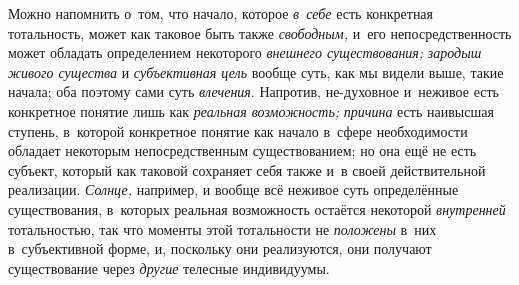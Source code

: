 Можно напомнить о~том, что начало, которое {\em в~себе} есть
конкретная тотальность, может как таковое быть также {\em свободным,} и~его
непосредственность может обладать определением некоторого
{\em внешнего существования;}
{\em зародыш живого существа} и {\em субъективная цель}
вообще суть, как мы видели выше, такие начала; оба поэтому
сами суть {\em влечения}.
Напротив, не-духовное и~неживое есть конкретное понятие лишь
как {\em реальная возможность;} {\em причина} есть
наивысшая ступень, в~которой конкретное понятие как начало в~сфере
необходимости обладает некоторым непосредственным существованием; но она
ещё не есть субъект, который как таковой сохраняет себя также и~в своей
действительной реализации. {\em Солнце,} например, и
вообще всё неживое суть определённые существования, в~которых реальная
возможность остаётся некоторой {\em внутренней}
тотальностью, так что моменты этой тотальности не
{\em положены}
в~них в~субъективной форме, и, поскольку они реализуются, они
получают существование через {\em другие} телесные индивидуумы.

